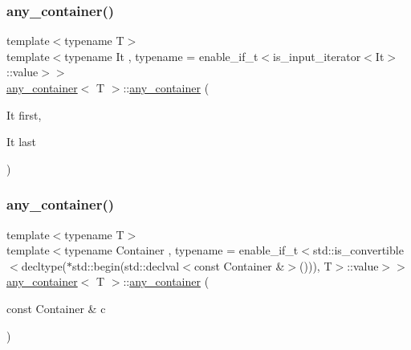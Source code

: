 \subsubsection{\texorpdfstring{any\_container()}{any\_container()}\hspace{0.1cm}{\footnotesize\ttfamily [2/5]}}
{\footnotesize\ttfamily template$<$typename T$>$ \\
template$<$typename It , typename  = enable\+\_\+if\+\_\+t$<$is\+\_\+input\+\_\+iterator$<$\+It$>$\+::value$>$$>$ \\
\mbox{\hyperlink{classany__container}{any\+\_\+container}}$<$ T $>$\+::\mbox{\hyperlink{classany__container}{any\+\_\+container}} (\begin{DoxyParamCaption}\item[{It}]{first,  }\item[{It}]{last }\end{DoxyParamCaption})\hspace{0.3cm}{\ttfamily [inline]}}

\mbox{\label{classany__container_a683c6b51acd3f23aa48505b2bca83629}} 
\subsubsection{\texorpdfstring{any\_container()}{any\_container()}\hspace{0.1cm}{\footnotesize\ttfamily [3/5]}}
{\footnotesize\ttfamily template$<$typename T$>$ \\
template$<$typename Container , typename  = enable\+\_\+if\+\_\+t$<$std\+::is\+\_\+convertible$<$decltype($\ast$std\+::begin(std\+::declval$<$const Container \&$>$())), T$>$\+::value$>$$>$ \\
\mbox{\hyperlink{classany__container}{any\+\_\+container}}$<$ T $>$\+::\mbox{\hyperlink{classany__container}{any\+\_\+container}} (\begin{DoxyParamCaption}\item[{const Container \&}]{c }\end{DoxyParamCaption})\hspace{0.3cm}{\ttfamily [inline]}}

\mbox{\label{classany__container_a7bc3471a016f7dafe3878fa66497ad26}} 
